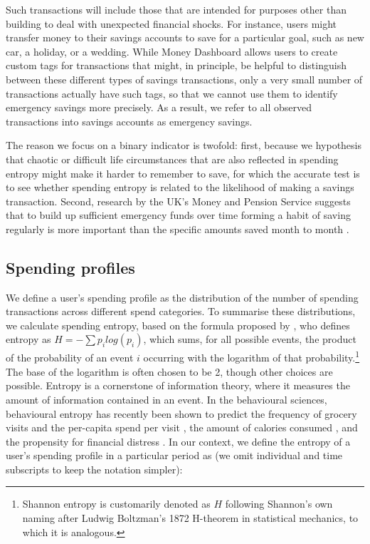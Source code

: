 Such transactions will include those that are intended for purposes other than
building to deal with unexpected financial shocks. For instance, users might
transfer money to their savings accounts to save for a particular goal, such as
new car, a holiday, or a wedding. While Money Dashboard allows users to create
custom tags for transactions that might, in principle, be helpful to
distinguish between these different types of savings transactions, only a very
small number of transactions actually have such tags, so that we cannot use
them to identify emergency savings more precisely. As a result, we refer to all
observed transactions into savings accounts as emergency savings.

The reason we focus on a binary indicator is twofold: first, because we
hypothesis that chaotic or difficult life circumstances that are also reflected
in spending entropy might make it harder to remember to save, for which the
accurate test is to see whether spending entropy is related to the likelihood
of making a savings transaction. Second, research by the UK's Money and Pension
Service suggests that to build up sufficient emergency funds over time forming a habit
of saving regularly is more important than the specific amounts saved month to
month \citep{mps2018building}.

\subsection{Spending profiles}%
\label{sub:spending_profiles}

We define a user's spending profile as the distribution of the number of
spending transactions across different spend categories. To summarise these
distributions, we calculate spending entropy, based on the formula proposed by
\citet{shannon1948mathematical}, who defines entropy as $H =
-\sum{p_i}log(p_i)$, which sums, for all possible events, the product of the
probability of an event $i$ occurring with the logarithm of that
probability.\footnote{Shannon entropy is customarily denoted as $H$ following
Shannon's own naming after Ludwig Boltzman's 1872 H-theorem in statistical
mechanics, to which it is analogous.} The base of the logarithm is often chosen
to be 2, though other choices are possible. Entropy is a cornerstone of
information theory, where it measures the amount of information contained in an
event. In the behavioural sciences, behavioural entropy has recently been shown
to predict the frequency of grocery visits and the per-capita spend per visit
\citep{guidotti2015behavioral}, the amount of calories consumed
\citep{skatova2019those}, and the propensity for financial distress
\citep{muggleton2020evidence}. In our context, we define the entropy of a
user's spending profile in a particular period as (we omit individual and time
subscripts to keep the notation simpler):

